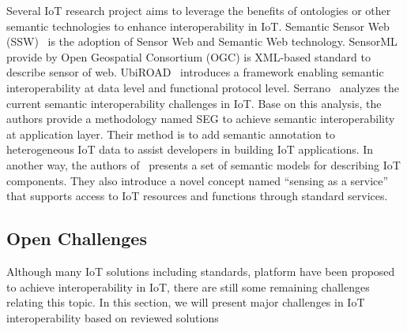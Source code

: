 Several IoT research project aims to leverage the benefits of ontologies or other semantic technologies to enhance interoperability in IoT. Semantic Sensor Web (SSW)~\cite{sheth2008semantic} is the adoption of Sensor Web and Semantic Web technology. SensorML~\cite{botts2007opengis} provide by Open Geospatial Consortium (OGC) is XML-based standard to describe sensor of web. UbiROAD~\cite{terziyan2010ubiroad} introduces a framework enabling semantic interoperability at data level and functional protocol level. Serrano~\cite{gyrard2016connected} analyzes the current semantic interoperability challenges in IoT. Base on this analysis, the authors provide a methodology named SEG to achieve semantic interoperability at application layer. Their method is to add semantic annotation to heterogeneous IoT data to assist developers in building IoT applications. In another way, the authors of~\cite{de2011service} presents a set of semantic models for describing IoT components. They also introduce a novel concept named ``sensing as a service'' that supports access to IoT resources and functions through standard services.

\subsection{Open Challenges}

Although many IoT solutions including standards, platform have been proposed to achieve interoperability in IoT, there are still some remaining challenges relating this topic. In this section, we will present major challenges in IoT interoperability based on reviewed solutions

